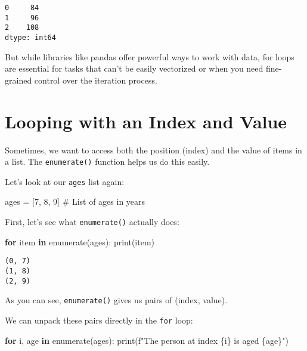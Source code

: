 \documentclass[
  letterpaper,
  DIV=11,
  numbers=noendperiod]{scrreprt}
\newenvironment{Shaded}{\begin{snugshade}}{\end{snugshade}}
\newcommand{\BuiltInTok}[1]{\textcolor[rgb]{0.00,0.23,0.31}{#1}}
\newcommand{\CommentTok}[1]{\textcolor[rgb]{0.37,0.37,0.37}{#1}}
\newcommand{\ControlFlowTok}[1]{\textcolor[rgb]{0.00,0.23,0.31}{\textbf{#1}}}
\newcommand{\DecValTok}[1]{\textcolor[rgb]{0.68,0.00,0.00}{#1}}
\newcommand{\KeywordTok}[1]{\textcolor[rgb]{0.00,0.23,0.31}{\textbf{#1}}}
\newcommand{\NormalTok}[1]{\textcolor[rgb]{0.00,0.23,0.31}{#1}}
\newcommand{\OperatorTok}[1]{\textcolor[rgb]{0.37,0.37,0.37}{#1}}
\newcommand{\SpecialCharTok}[1]{\textcolor[rgb]{0.37,0.37,0.37}{#1}}
\newcommand{\SpecialStringTok}[1]{\textcolor[rgb]{0.13,0.47,0.30}{#1}}
\begin{document}
\begin{verbatim}
0     84
1     96
2    108
dtype: int64
\end{verbatim}

But while libraries like pandas offer powerful ways to work with data,
for loops are essential for tasks that can't be easily vectorized or
when you need fine-grained control over the iteration process.

\section{Looping with an Index and
Value}\label{looping-with-an-index-and-value}

Sometimes, we want to access both the position (index) and the value of
items in a list. The \texttt{enumerate()} function helps us do this
easily.

Let's look at our \texttt{ages} list again:

\begin{Shaded}
\begin{Highlighting}[]
\NormalTok{ages }\OperatorTok{=}\NormalTok{ [}\DecValTok{7}\NormalTok{, }\DecValTok{8}\NormalTok{, }\DecValTok{9}\NormalTok{]  }\CommentTok{\# List of ages in years}
\end{Highlighting}
\end{Shaded}

First, let's see what \texttt{enumerate()} actually does:

\begin{Shaded}
\begin{Highlighting}[]
\ControlFlowTok{for}\NormalTok{ item }\KeywordTok{in} \BuiltInTok{enumerate}\NormalTok{(ages):}
    \BuiltInTok{print}\NormalTok{(item)}
\end{Highlighting}
\end{Shaded}

\begin{verbatim}
(0, 7)
(1, 8)
(2, 9)
\end{verbatim}

As you can see, \texttt{enumerate()} gives us pairs of (index, value).

We can unpack these pairs directly in the \texttt{for} loop:

\begin{Shaded}
\begin{Highlighting}[]
\ControlFlowTok{for}\NormalTok{ i, age }\KeywordTok{in} \BuiltInTok{enumerate}\NormalTok{(ages):}
    \BuiltInTok{print}\NormalTok{(}\SpecialStringTok{f"The person at index }\SpecialCharTok{\{}\NormalTok{i}\SpecialCharTok{\}}\SpecialStringTok{ is aged }\SpecialCharTok{\{}\NormalTok{age}\SpecialCharTok{\}}\SpecialStringTok{"}\NormalTok{)}
\end{Highlighting}
\end{Shaded}
\end{document}
